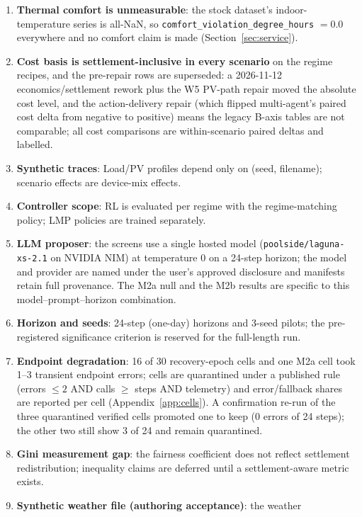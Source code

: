 \documentclass[11pt,a4paper]{article}
\begin{document}
\begin{enumerate}
    \item \textbf{Thermal comfort is unmeasurable}: the stock dataset's indoor-temperature series is all-NaN, so \texttt{comfort\_violation\_degree\_hours} $= 0.0$ everywhere and no comfort claim is made (Section~\ref{sec:service}).
    \item \textbf{Cost basis is settlement-inclusive in every scenario} on the regime recipes, and the pre-repair rows are superseded: a 2026-11-12 economics/settlement rework plus the W5 PV-path repair moved the absolute cost level, and the action-delivery repair (which flipped multi-agent's paired cost delta from negative to positive) means the legacy B-axis tables are not comparable; all cost comparisons are within-scenario paired deltas and labelled.
    \item \textbf{Synthetic traces}: Load/PV profiles depend only on (seed, filename); scenario effects are device-mix effects.
    \item \textbf{Controller scope}: RL is evaluated per regime with the regime-matching policy; LMP policies are trained separately.
    \item \textbf{LLM proposer}: the screens use a single hosted model (\texttt{poolside/laguna-xs-2.1} on NVIDIA NIM) at temperature 0 on a 24-step horizon; the model and provider are named under the user's approved disclosure and manifests retain full provenance. The M2a null and the M2b results are specific to this model--prompt--horizon combination.
    \item \textbf{Horizon and seeds}: 24-step (one-day) horizons and 3-seed pilots; the pre-registered significance criterion is reserved for the full-length run.
    \item \textbf{Endpoint degradation}: 16 of 30 recovery-epoch cells and one M2a cell took 1--3 transient endpoint errors; cells are quarantined under a published rule (errors $\leq 2$ AND calls $\geq$ steps AND telemetry) and error/fallback shares are reported per cell (Appendix~\ref{app:cells}). A confirmation re-run of the three quarantined verified cells promoted one to keep (0 errors of 24 steps); the other two still show 3 of 24 and remain quarantined.
    \item \textbf{Gini measurement gap}: the fairness coefficient does not reflect settlement redistribution; inequality claims are deferred until a settlement-aware metric exists.
    \item \textbf{Synthetic weather file (authoring acceptance)}: the weather

\end{enumerate}
\end{document}
